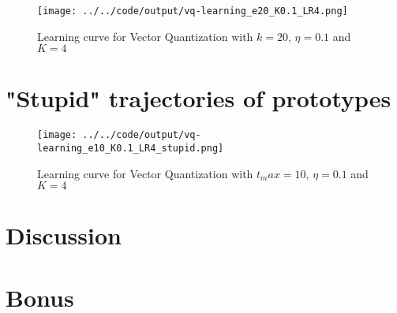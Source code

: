 \documentclass[twoside, a4paper, fleqn, reqno]{article}
\begin{document}
\begin{figure}[H]
	\centering
	\texttt{[image: ../../code/output/vq-learning\_e20\_K0.1\_LR4.png]}
	\caption{Learning curve for Vector Quantization with $k=20$, $\eta=0.1$ and $K=4$}
	\label{fig:vq-learning_e20_K0.1_LR4}
\end{figure}

\section{"Stupid" trajectories of prototypes}

\begin{figure}[H]
	\centering
	\texttt{[image: ../../code/output/vq-learning\_e10\_K0.1\_LR4\_stupid.png]}
	\caption{Learning curve for Vector Quantization with $t_max=10$, $\eta=0.1$ and $K=4$}
	\label{fig:vq-learning_e20_K0.1_LR4_stupid}
\end{figure}

\section{Discussion}

\section{Bonus}
\end{document}
